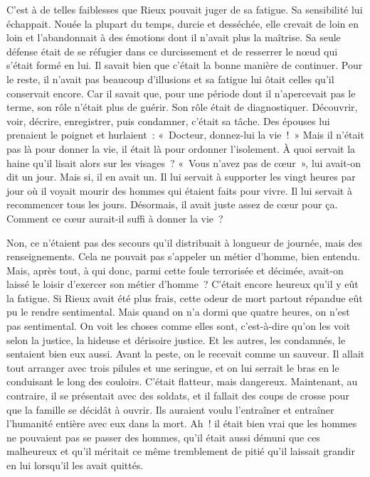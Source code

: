 \documentclass[french,twoside]{book} %
\begin{document}
C’est à de telles faiblesses que Rieux pouvait juger de sa fatigue. Sa sensibilité lui échappait. Nouée la plupart du temps, durcie et desséchée, elle crevait de loin en loin et l’abandonnait à des émotions dont il n’avait plus la maîtrise. Sa seule défense était de se réfugier dans ce durcissement et de resserrer le nœud qui s’était formé en lui. Il savait bien que c’était la bonne manière de continuer. Pour le reste, il n’avait pas beaucoup d’illusions et sa fatigue lui ôtait celles qu’il conservait encore. Car il savait que, pour une période dont il n’apercevait pas le terme, son rôle n’était plus de guérir. Son rôle était de diagnostiquer. Découvrir, voir, décrire, enregistrer, puis condamner, c’était sa tâche. Des épouses lui prenaient le poignet et hurlaient : « Docteur, donnez-lui la vie ! » Mais il n’était pas là pour donner la vie, il était là pour ordonner l’isolement. À quoi servait la haine qu’il lisait alors sur les visages ? « Vous n’avez pas de cœur », lui avait-on dit un jour. Mais si, il en avait un. Il lui servait à supporter les vingt heures par jour où il voyait mourir des hommes qui étaient faits pour vivre. Il lui servait à recommencer tous les jours. Désormais, il avait juste assez de cœur pour ça. Comment ce cœur aurait-il suffi à donner la vie ?\par
Non, ce n’étaient pas des secours qu’il distribuait à longueur de journée, mais des renseignements. Cela ne pouvait pas s’appeler un métier d’homme, bien entendu. Mais, après tout, à qui donc, parmi cette foule terrorisée et décimée, avait-on laissé le loisir d’exercer son métier d’homme ? C’était encore heureux qu’il y eût la fatigue. Si Rieux avait été plus frais, cette odeur de mort partout répandue eût pu le rendre sentimental. Mais quand on n’a dormi que quatre heures, on n’est pas sentimental. On voit les choses comme elles sont, c’est-à-dire qu’on les voit selon la justice, la hideuse et dérisoire justice. Et les autres, les condamnés, le sentaient bien eux aussi. Avant la peste, on le recevait comme un sauveur. Il allait tout arranger avec trois pilules et une seringue, et on lui serrait le bras en le conduisant le long des couloirs. C’était flatteur, mais dangereux. Maintenant, au contraire, il se présentait avec des soldats, et il fallait des coups de crosse pour que la famille se décidât à ouvrir. Ils auraient voulu l’entraîner et entraîner l’humanité entière avec eux dans la mort. Ah ! il était bien vrai que les hommes ne pouvaient pas se passer des hommes, qu’il était aussi démuni que ces malheureux et qu’il méritait ce même tremblement de pitié qu’il laissait grandir en lui lorsqu’il les avait quittés.\par
\end{document}

